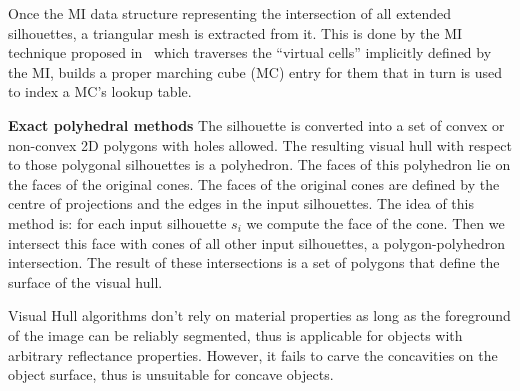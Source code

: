 Once the MI data structure representing the intersection of all extended silhouettes, a triangular mesh is extracted from it. This is done by the MI technique proposed in~\cite{rocchini2001marching} which traverses the ``virtual cells'' implicitly defined by the MI, builds a proper marching cube (MC) entry for them that in turn is used to index a MC's lookup table.

\textbf{Exact polyhedral methods} 
The silhouette is converted into a set of convex or non-convex 2D polygons with holes allowed. The resulting visual hull with respect to those polygonal silhouettes is a polyhedron. The faces of this polyhedron lie on the faces of the original cones. The faces of the original cones are defined by the centre of projections and the edges in the input silhouettes. The idea of this method is: for each input silhouette $s_i$ we compute the face of the cone. Then we intersect this face with cones of all other input silhouettes, \ie a polygon-polyhedron intersection. The result of these intersections is a set of polygons that define the surface of the visual hull.


Visual Hull algorithms don't rely on material properties as long as the foreground of the image can be reliably segmented, thus is applicable for objects with arbitrary reflectance properties. However, it fails to carve the concavities on the object surface, thus is unsuitable for concave objects.


